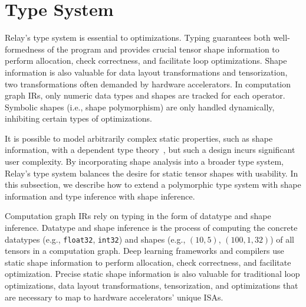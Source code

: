 \section{Type System}
\label{sec:type_system}

Relay's type system is essential
  to optimizations.
Typing guarantees both well-formedness of the program
  and provides crucial tensor shape information to perform allocation,
  check correctness, and facilitate loop optimizations.
Shape information is also valuable for data layout transformations and tensorization,
  two transformations often demanded by hardware accelerators.
In computation graph IRs, only numeric data types
  and shapes are tracked for each operator.
Symbolic shapes (i.e., shape polymorphism) are only handled
  dynamically, inhibiting certain types of optimizations.

It is possible to model arbitrarily complex static properties, such
  as shape information, with a dependent type theory~\citep{selsam_certigrad}, but such
  a design incurs significant user complexity.
By incorporating shape analysis into a broader type system,
  Relay's type system balances the desire for static tensor shapes
  with usability.
In this subsection, we describe how to extend a polymorphic type system with shape
  information and type inference with shape inference.


  Computation graph IRs rely on typing in the form of
  datatype and shape inference.
Datatype and shape inference is the process of computing the
  concrete datatypes (e.g., \verb|float32|, \verb|int32|) and shapes (e.g., $(10, 5)$, $(100, 1, 32)$) of all
  tensors in a computation graph.
Deep learning frameworks and compilers use static shape information
  to perform allocation, check correctness, and facilitate optimization.
Precise static shape information is also valuable for traditional loop
  optimizations, data layout transformations, tensorization, and
  optimizations that are necessary to map to hardware accelerators' unique ISAs.

